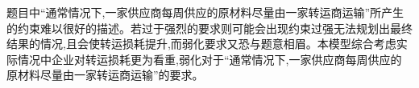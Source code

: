 题目中“通常情况下,一家供应商每周供应的原材料尽量由一家转运商运输”所产生的约束难以很好的描述。若过于强烈的要求则可能会出现约束过强无法规划出最终结果的情况,且会使转运损耗提升,而弱化要求又恐与题意相眉。本模型综合考虑实际情况中企业对转运损耗更为看重,弱化对于“通常情况下,一家供应商每周供应的原材料尽量由一家转运商运输”的要求。
